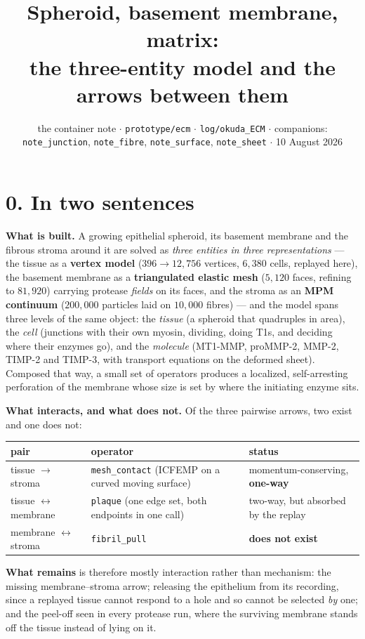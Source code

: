 \documentclass[10pt,a4paper]{article}
\title{\vspace{-1.4cm}\textbf{Spheroid, basement membrane, matrix:\\
\normalsize the three-entity model and the arrows between them}}
\author{}
\date{\vspace{-0.9cm}\small the container note $\cdot$ \texttt{prototype/ecm} $\cdot$
\texttt{log/okuda\_ECM} $\cdot$
companions: \texttt{note\_junction}, \texttt{note\_fibre}, \texttt{note\_surface},
\texttt{note\_sheet} $\cdot$ 10 August 2026}
\newcommand{\op}[1]{\texttt{#1}}
\begin{document}
\maketitle\vspace{-1.0cm}


\section*{0.\; In two sentences}

\textbf{What is built.} A growing epithelial spheroid, its basement membrane and the fibrous stroma
around it are solved as \emph{three entities in three representations} --- the tissue as a
\textbf{vertex model} ($396\!\to\!12{,}756$ vertices, $6{,}380$ cells, replayed here), the basement
membrane as a \textbf{triangulated elastic mesh} ($5{,}120$ faces, refining to $81{,}920$) carrying
protease \emph{fields} on its faces, and the stroma as an \textbf{MPM continuum} ($200{,}000$
particles laid on $10{,}000$ fibres) --- and the model spans three levels of the same object: the
\emph{tissue} (a spheroid that quadruples in area), the \emph{cell} (junctions with their own myosin,
dividing, doing T1s, and deciding where their enzymes go), and the \emph{molecule} (MT1-MMP,
proMMP-2, MMP-2, TIMP-2 and TIMP-3, with transport equations on the deformed sheet). Composed that
way, a small set of operators produces a localized, self-arresting perforation of the membrane whose
size is set by where the initiating enzyme sits.

\textbf{What interacts, and what does not.} Of the three pairwise arrows, two exist and one does not:
%
\begin{center}\footnotesize
\begin{tabular}{@{}lll@{}}\toprule
pair & operator & status\\\midrule
tissue $\to$ stroma & \op{mesh\_contact} (ICFEMP on a curved moving surface) &
  momentum-conserving, \textbf{one-way}\\
tissue $\leftrightarrow$ membrane & \op{plaque} (one edge set, both endpoints in one call) &
  two-way, but absorbed by the replay\\
membrane $\leftrightarrow$ stroma & \op{fibril\_pull} &
  \textbf{does not exist}\\
\bottomrule\end{tabular}
\end{center}
%
\textbf{What remains} is therefore mostly interaction rather than mechanism: the missing
membrane--stroma arrow; releasing the epithelium from its recording, since a replayed tissue cannot
respond to a hole and so cannot be selected \emph{by} one; and the peel-off seen in every protease run,
where the surviving membrane stands off the tissue instead of lying on it.
\end{document}
